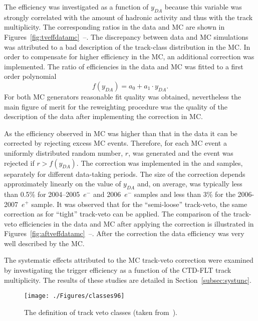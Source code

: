 The efficiency was investigated as a function of $y_{DA}$ because this variable was strongly correlated with the amount of hadronic activity and thus with the track multiplicity. The corresponding ratios in the data and MC are shown in Figures~\ref{fig:tveffdatamc}~--. The discrepancy between data and MC simulations was attributed to a bad description of the track-class distribution in the MC. In order to compensate for higher efficiency in the MC, an additional correction was implemented. The ratio of efficiencies in the data and MC was fitted to a first order polynomial
\begin{equation} 
 f\left(y_{DA}\right)=a_0 + a_1 \cdot y_{DA}.
\end{equation}
For both MC generators reasonable fit quality was obtained, nevertheless the main figure of merit for the reweighting procedure was the quality of the description of the data after implementing the correction in MC.

As the efficiency observed in MC was higher than that in the data it can be corrected by rejecting excess MC events. Therefore, for each MC event a uniformly distributed random number, $r$, was generated and the event was rejected if $r > f\left(y_{DA}\right)$. The correction was implemented in the \lepto and \ariadne samples, separately for different data-taking periods. The size of the correction depends approximately linearly on the value of $y_{DA}$ and, on average, was typically less than 0.5\% for 2004--2005~$e^-$ and 2006~$e^-$ samples and less than 3\% for the 2006-2007~$e^+$ sample. It was observed that for the ``semi-loose'' track-veto, the same correction as for ``tight'' track-veto can be applied. The comparison of the track-veto efficiencies in the data and MC after applying the correction is illustrated in Figures~\ref{fig:aftveffdatamc}~--. After the correction the data efficiency was very well described by the MC. 

The systematic effects attributed to the MC track-veto correction were examined by investigating the trigger efficiency as a function of the CTD-FLT track multiplicity. The results of these studies are detailed in Section~\ref{subsec:systunc}.
\begin{figure}[t]
  \begin{center}
    \texttt{[image: ./Figures/classes96]}
  \end{center}
  \caption{The definition of track veto classes (taken from~\protect\cite{YamazakiSite}).}
  \label{fig:trackvetodefinition}
\end{figure}

